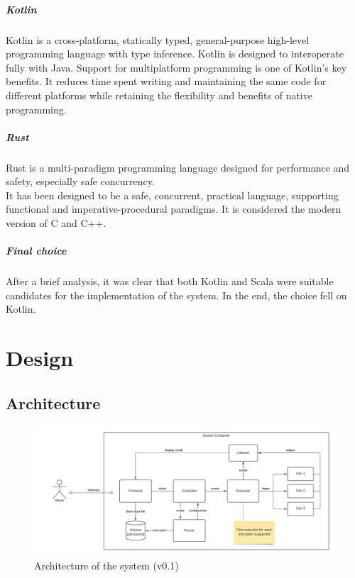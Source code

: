 \documentclass[12pt,a4paper,openright,twoside]{book}
\begin{document}
\paragraph*{Kotlin}
Kotlin is a cross-platform, statically typed, general-purpose high-level programming language with type inference. 
Kotlin is designed to interoperate fully with Java.
Support for multiplatform programming is one of Kotlin’s key benefits. It reduces time spent writing and maintaining 
the same code for different platforms while retaining the flexibility and benefits of native programming.

\paragraph*{Rust}

Rust is a multi-paradigm programming language designed for performance and safety, especially safe concurrency. \\
It has been designed to be a safe, concurrent, practical language, supporting functional and imperative-procedural paradigms.
It is considered the modern version of C and C++.

\paragraph*{Final choice}
After a brief analysis, it was clear that both Kotlin and Scala were suitable candidates for the implementation of the system.
In the end, the choice fell on Kotlin.

\chapter{Design}

\section{Architecture}

\begin{figure}[h]
    \centering
    \includegraphics[width=\textwidth]{figures/architecture.png}
    \caption{Architecture of the system (v0.1)}
    \label{fig:random-image}
\end{figure}
\end{document}
